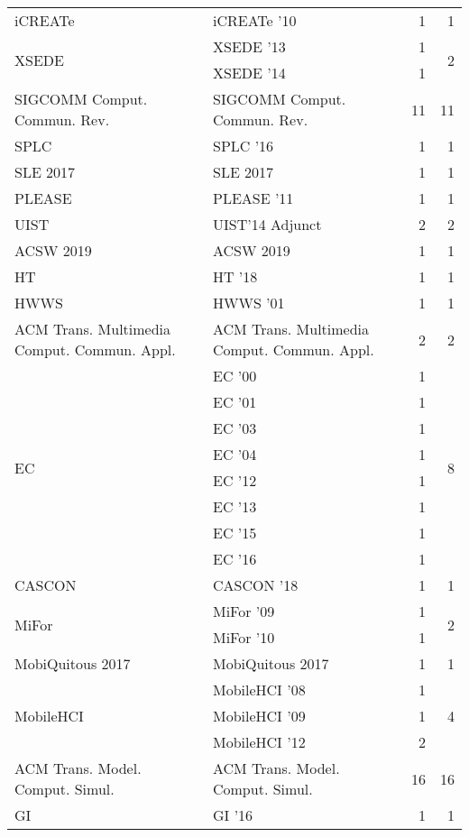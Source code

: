 \begin{table*}[t]
\begin{tabular}{llrr}
\multirow{1}{*}{iCREATe } & iCREATe '10 & 1 & \multirow{1}{*}{1}\\
\multirow{2}{*}{XSEDE } & XSEDE '13 & 1 & \multirow{2}{*}{2}\\
& XSEDE '14 & 1 &\\
\multirow{1}{*}{SIGCOMM Comput. Commun. Rev.} & SIGCOMM Comput. Commun. Rev. & 11 & \multirow{1}{*}{11}\\
\multirow{1}{*}{SPLC } & SPLC '16 & 1 & \multirow{1}{*}{1}\\
\multirow{1}{*}{SLE 2017} & SLE 2017 & 1 & \multirow{1}{*}{1}\\
\multirow{1}{*}{PLEASE } & PLEASE '11 & 1 & \multirow{1}{*}{1}\\
\multirow{1}{*}{UIST} & UIST'14 Adjunct & 2 & \multirow{1}{*}{2}\\
\multirow{1}{*}{ACSW 2019} & ACSW 2019 & 1 & \multirow{1}{*}{1}\\
\multirow{1}{*}{HT } & HT '18 & 1 & \multirow{1}{*}{1}\\
\multirow{1}{*}{HWWS } & HWWS '01 & 1 & \multirow{1}{*}{1}\\
\multirow{1}{*}{ACM Trans. Multimedia Comput. Commun. Appl.} & ACM Trans. Multimedia Comput. Commun. Appl. & 2 & \multirow{1}{*}{2}\\
\multirow{8}{*}{EC } & EC '00 & 1 & \multirow{8}{*}{8}\\
& EC '01 & 1 &\\
& EC '03 & 1 &\\
& EC '04 & 1 &\\
& EC '12 & 1 &\\
& EC '13 & 1 &\\
& EC '15 & 1 &\\
& EC '16 & 1 &\\
\multirow{1}{*}{CASCON } & CASCON '18 & 1 & \multirow{1}{*}{1}\\
\multirow{2}{*}{MiFor } & MiFor '09 & 1 & \multirow{2}{*}{2}\\
& MiFor '10 & 1 &\\
\multirow{1}{*}{MobiQuitous 2017} & MobiQuitous 2017 & 1 & \multirow{1}{*}{1}\\
\multirow{3}{*}{MobileHCI } & MobileHCI '08 & 1 & \multirow{3}{*}{4}\\
& MobileHCI '09 & 1 &\\
& MobileHCI '12 & 2 &\\
\multirow{1}{*}{ACM Trans. Model. Comput. Simul.} & ACM Trans. Model. Comput. Simul. & 16 & \multirow{1}{*}{16}\\
\multirow{1}{*}{GI } & GI '16 & 1 & \multirow{1}{*}{1}\\

\end{tabular}
\end{table*}
